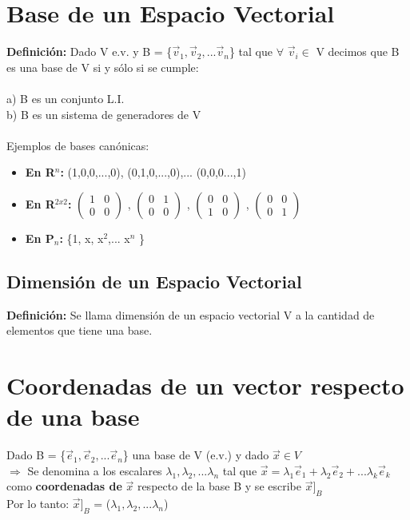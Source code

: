 \documentclass{article}
\begin{document}
\section{Base de un Espacio Vectorial}
{\bfseries Definición:} Dado V e.v. y B = \{$\vec{v}_{1}, \vec{v}_2,... \vec{v}_n $\} tal que $\forall$ $\vec{v}_{i} \in$ V decimos que B es una base de V si y sólo si se cumple:\\\\
a) B es un conjunto L.I.\\
b) B es un sistema de generadores de V \\\\
Ejemplos de bases canónicas: 
\begin{itemize}
\item {\bfseries En R$^{n}$:} (1,0,0,...,0), (0,1,0,...,0),... (0,0,0...,1) 
\item {\bfseries En R$^{2x2}$:} $\begin{pmatrix} 1&0\\ 0&0 \end{pmatrix}$ , $\begin{pmatrix} 0&1\\ 0&0 \end{pmatrix}$ , $\begin{pmatrix} 0&0\\ 1&0 \end{pmatrix}$ , $\begin{pmatrix} 0&0\\ 0&1 \end{pmatrix}$ 
\item {\bfseries En P$_{n}$:} \{1, x, x$^2$,... x$^n$ \} 
\end{itemize}
\subsection{Dimensión de un Espacio Vectorial}
{\bfseries Definición:} Se llama dimensión de un espacio vectorial V a la cantidad de elementos que tiene una base.
\section{Coordenadas de un vector respecto de una base}
Dado B = \{$\vec{e}_{1}, \vec{e}_2,... \vec{e}_n $\} una base de V (e.v.) y dado $\vec{x} \in V$\\ 
$\Rightarrow$ Se denomina a los escalares $\lambda_{1}, \lambda_{2},... \lambda_{n}$ tal que $\vec{x} = \lambda_{1}\vec{e}_{1} + \lambda_{2}\vec{e}_{2} +... \lambda_{k}\vec{e}_{k}$ como {\bfseries coordenadas de} $\vec{x} $ respecto de la base B y se escribe $\vec{x}]_B$ \\
Por lo tanto: $\vec{x}]_B$ = ($\lambda_{1}, \lambda_{2},... \lambda_{n}$)
\newpage
\end{document}
